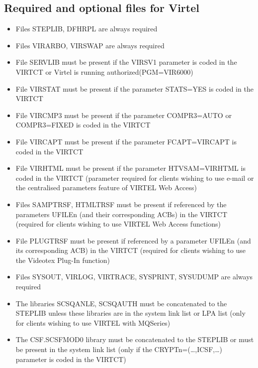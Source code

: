 \documentclass[letterpaper,10pt,english]{sphinxmanual}
\begin{document}
\subsection{Required and optional files for Virtel}
\label{\detokenize{Installation_Guide:required-and-optional-files-for-virtel}}\begin{itemize}
\item {} 
Files STEPLIB, DFHRPL are always required

\item {} 
Files VIRARBO, VIRSWAP are always required

\item {} 
File SERVLIB must be present if the VIRSV1 parameter is coded in the VIRTCT or Virtel is running authorized(PGM=VIR6000)

\item {} 
File VIRSTAT must be present if the parameter STATS=YES is coded in the VIRTCT

\item {} 
File VIRCMP3 must be present if the parameter COMPR3=AUTO or COMPR3=FIXED is coded in the VIRTCT

\item {} 
File VIRCAPT must be present if the parameter FCAPT=VIRCAPT is coded in the VIRTCT

\item {} 
File VIRHTML must be present if the parameter HTVSAM=VIRHTML is coded in the VIRTCT (parameter required for clients wishing to use e-mail or the centralised parameters feature of VIRTEL Web Access)

\item {} 
Files SAMPTRSF, HTMLTRSF must be present if referenced by the parameters UFILEn (and their corresponding ACBs) in the VIRTCT (required for clients wishing to use VIRTEL Web Access functions)

\item {} 
File PLUGTRSF must be present if referenced by a parameter UFILEn (and its corresponding ACB) in the VIRTCT (required for clients wishing to use the Videotex Plug-In function)

\item {} 
Files SYSOUT, VIRLOG, VIRTRACE, SYSPRINT, SYSUDUMP are always required

\item {} 
The libraries SCSQANLE, SCSQAUTH must be concatenated to the STEPLIB unless these libraries are in the system link list or LPA list (only for clients wishing to use VIRTEL with MQSeries)

\item {} 
The CSF.SCSFMOD0 library must be concatenated to the STEPLIB or must be present in the system link list (only if the CRYPTn=(…,ICSF,…) parameter is coded in the VIRTCT)

\end{itemize}
\end{document}
